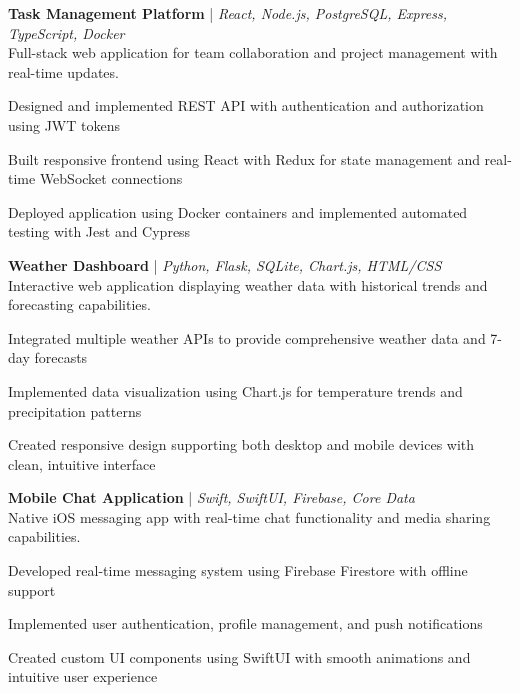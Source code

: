 \noindent\textbf{Task Management Platform} | \emph{React, Node.js, PostgreSQL, Express, TypeScript, Docker}\\
Full-stack web application for team collaboration and project management with real-time updates.
\begin{tightitemize}
  \item Designed and implemented REST API with authentication and authorization using JWT tokens
  \item Built responsive frontend using React with Redux for state management and real-time WebSocket connections
  \item Deployed application using Docker containers and implemented automated testing with Jest and Cypress
\end{tightitemize}

\vspace{0.3em}
\noindent\textbf{Weather Dashboard} | \emph{Python, Flask, SQLite, Chart.js, HTML/CSS}\\
Interactive web application displaying weather data with historical trends and forecasting capabilities.
\begin{tightitemize}
  \item Integrated multiple weather APIs to provide comprehensive weather data and 7-day forecasts
  \item Implemented data visualization using Chart.js for temperature trends and precipitation patterns
  \item Created responsive design supporting both desktop and mobile devices with clean, intuitive interface
\end{tightitemize}

\vspace{0.3em}
\noindent\textbf{Mobile Chat Application} | \emph{Swift, SwiftUI, Firebase, Core Data}\\
Native iOS messaging app with real-time chat functionality and media sharing capabilities.
\begin{tightitemize}
  \item Developed real-time messaging system using Firebase Firestore with offline support
  \item Implemented user authentication, profile management, and push notifications
  \item Created custom UI components using SwiftUI with smooth animations and intuitive user experience
\end{tightitemize}